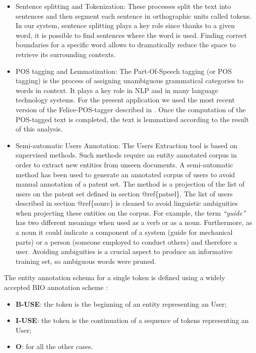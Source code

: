 \documentclass[]{book}
\providecommand{\tightlist}{%
  \setlength{\itemsep}{0pt}\setlength{\parskip}{0pt}}
\theoremstyle{definition}
\theoremstyle{definition}
\theoremstyle{definition}
\theoremstyle{remark}
\begin{document}
\begin{itemize}
\item
  Sentence splitting and Tokenization: These processes split the text
  into sentences and then segment each sentence in orthographic units
  called tokens. In our system, sentence splitting plays a key role
  since thanks to a given word, it is possible to find sentences where
  the word is used. Finding correct boundaries for a specific word
  allows to dramatically reduce the space to retrieve its surrounding
  contexts.
\item
  POS tagging and Lemmatization: The Part-Of-Speech tagging (or POS
  tagging) is the process of assigning unambiguous grammatical
  categories to words in context. It plays a key role in NLP and in many
  language technology systems. For the present application we used the
  most recent version of the Felice-POS-tagger described in
  \citep{dell2009ensemble}. Once the computation of the POS-tagged text
  is completed, the text is lemmatized according to the result of this
  analysis.
\item
  Semi-automatic Users Annotation: The Users Extraction tool is based on
  supervised methods. Such methods require an entity annotated corpus in
  order to extract new entities from unseen documents. A semi-automatic
  method has been used to generate an annotated corpus of users to avoid
  manual annotation of a patent set. The method is a projection of the
  list of users on the patent set defined in section @ref\{patsel\}. The
  list of users described in section @ref\{sourc\} is cleaned to avoid
  linguistic ambiguities when projecting these entities on the corpus.
  For example, the term \emph{``guide''} has two different meanings when
  used as a verb or as a noun. Furthermore, as a noun it could indicate
  a component of a system (guide for mechanical parts) or a person
  (someone employed to conduct others) and therefore a user. Avoiding
  ambiguities is a crucial aspect to produce an informative training
  set, so ambiguous words were pruned.
\end{itemize}

The entity annotation schema for a single token is defined using a
widely accepted BIO annotation scheme \cite{ramshaw}:

\begin{itemize}
\tightlist
\item
  \textbf{B-USE}: the token is the beginning of an entity representing
  an User;
\item
  \textbf{I-USE}: the token is the continuation of a sequence of tokens
  representing an User;
\item
  \textbf{O}: for all the other cases.
\end{itemize}
\end{document}
